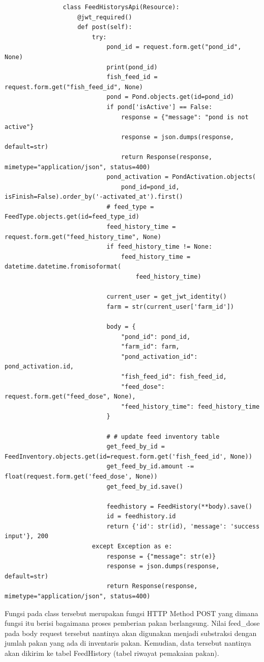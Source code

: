 \begin{spacing}{1.5}
\begin{enumerate}
\begin{itemize}
			\begin{lstlisting}
				class FeedHistorysApi(Resource):
					@jwt_required()
					def post(self):
						try:
							pond_id = request.form.get("pond_id", None)
							print(pond_id)
							fish_feed_id = request.form.get("fish_feed_id", None)
							pond = Pond.objects.get(id=pond_id)
							if pond['isActive'] == False:
								response = {"message": "pond is not active"}
								response = json.dumps(response, default=str)
								return Response(response, mimetype="application/json", status=400)
							pond_activation = PondActivation.objects(
								pond_id=pond_id, isFinish=False).order_by('-activated_at').first()
							# feed_type = FeedType.objects.get(id=feed_type_id)
							feed_history_time = request.form.get("feed_history_time", None)
							if feed_history_time != None:
								feed_history_time = datetime.datetime.fromisoformat(
									feed_history_time)
								
							current_user = get_jwt_identity()
							farm = str(current_user['farm_id'])
				
							body = {
								"pond_id": pond_id,
								"farm_id": farm,
								"pond_activation_id": pond_activation.id,
								"fish_feed_id": fish_feed_id,
								"feed_dose": request.form.get("feed_dose", None),
								"feed_history_time": feed_history_time
							}
				
							# # update feed inventory table
							get_feed_by_id = FeedInventory.objects.get(id=request.form.get('fish_feed_id', None))
							get_feed_by_id.amount -= float(request.form.get('feed_dose', None))
							get_feed_by_id.save()
				
							feedhistory = FeedHistory(**body).save()
							id = feedhistory.id
							return {'id': str(id), 'message': 'success input'}, 200
						except Exception as e:
							response = {"message": str(e)}
							response = json.dumps(response, default=str)
							return Response(response, mimetype="application/json", status=400)
			\end{lstlisting}
		\end{itemize}

		Fungsi pada class tersebut merupakan fungsi HTTP Method POST yang dimana fungsi itu berisi bagaimana proses pemberian pakan berlangsung. Nilai feed\_dose pada body request tersebut nantinya akan digunakan menjadi substraksi dengan jumlah pakan yang ada di inventaris pakan. Kemudian, data tersebut nantinya akan dikirim ke tabel FeedHistory (tabel riwayat pemakaian pakan).


\end{enumerate}
\end{spacing}
